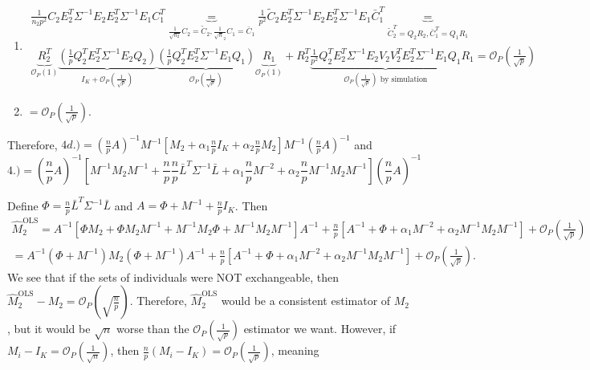 \documentclass{article}
\begin{document}
\begin{enumerate}
\begin{enumerate}
\begin{enumerate}
		\item \begin{multline}
		\frac{1}{n_2p^2}C_2E_2^T \Sigma^{-1}E_2E_2^T\Sigma^{-1}E_1C_1^T \underbrace{=}_{\frac{1}{\sqrt{n_2}}C_2 = \tilde{C}_2, \frac{1}{\sqrt{n}_2}C_1 = \bar{C}_1} \frac{1}{p^2}\tilde{C}_2 E_2^T \Sigma^{-1}E_2E_2^T\Sigma^{-1}E_1\bar{C}_1^T \underbrace{=}_{\tilde{C}_2^T = Q_2R_2, \bar{C}_1^T = Q_1R_1}\\
		\underbrace{R_2^T}_{\mathcal{O}_P(1)} \underbrace{\left(\frac{1}{p} Q_2^T E_2^T \Sigma^{-1}E_2Q_2 \right)}_{I_K + \mathcal{O}_P\left( \frac{1}{\sqrt{p}} \right)} \underbrace{\left(\frac{1}{p} Q_2^TE_2^T\Sigma^{-1}E_1 Q_1 \right)}_{\mathcal{O}_P\left( \frac{1}{\sqrt{p}} \right)} \underbrace{R_1}_{\mathcal{O}_P(1)} + R_2^T \underbrace{\frac{1}{p^2} Q_2^T E_2^T \Sigma^{-1}E_2V_2 V_2^TE_2^T\Sigma^{-1}E_1 Q_1}_{\mathcal{O}_P\left( \frac{1}{\sqrt{p}}\right) \text{ by simulation}} R_1 = \mathcal{O}_P\left( \frac{1}{\sqrt{p}}\right)
		\end{multline}				
		\item $ = \mathcal{O}_P\left( \frac{1}{\sqrt{p}}\right)$.
		\end{enumerate}
		Therefore, $4d.) = \left( \frac{n}{p}A \right)^{-1} M^{-1}\left[ M_2 + \alpha_1\frac{n}{p}I_K + \alpha_2\frac{n}{p} M_2 \right]M^{-1}\left( \frac{n}{p}A \right)^{-1}$ and
		\begin{equation}
		\text{4.)} = \left( \frac{n}{p}A \right)^{-1}\left[ M^{-1}M_2M^{-1} + \frac{n}{p}\frac{n}{p}\bar{L}^T\Sigma^{-1}\bar{L} + \alpha_1\frac{n}{p}M^{-2} + \alpha_2\frac{n}{p}M^{-1}M_2M^{-1} \right]\left( \frac{n}{p}A \right)^{-1}
		\end{equation}
	\end{enumerate}
\end{enumerate}
Define $\Phi = \frac{n}{p}\bar{L}^T \Sigma^{-1}\bar{L}$ and $A =  \Phi + M^{-1} + \frac{n}{p}I_K$. Then
\begin{multline}
\hat{M}_2^{\text{OLS}} = A^{-1}\left[ \Phi M_2 + \Phi M_2M^{-1} + M^{-1}M_2 \Phi + M^{-1}M_2 M^{-1}\right] A^{-1} + \frac{n}{p}\left[ A^{-1} + \Phi + \alpha_1 M^{-2} + \alpha_2 M^{-1}M_2 M^{-1} \right] + \mathcal{O}_P\left( \frac{1}{\sqrt{p}} \right)\\
= A^{-1}\left( \Phi + M^{-1} \right)M_2 \left( \Phi + M^{-1} \right)A^{-1} + \frac{n}{p}\left[ A^{-1} + \Phi + \alpha_1 M^{-2} + \alpha_2 M^{-1}M_2 M^{-1} \right] + \mathcal{O}_P\left( \frac{1}{\sqrt{p}} \right).
\end{multline}
We see that if the sets of individuals were NOT exchangeable, then $\hat{M}_2^{\text{OLS}} - M_2 = \mathcal{O}_P\left( \sqrt{\frac{n}{p}} \right)$. Therefore, $\hat{M}_2^{\text{OLS}}$ would be a consistent estimator of $M_2$, but it would be $\sqrt{n}$ worse than the $\mathcal{O}_P\left( \frac{1}{\sqrt{p}} \right)$ estimator we want. However, if $M_i - I_K = \mathcal{O}_P\left( \frac{1}{\sqrt{n}} \right)$, then $\frac{n}{p}\left( M_i - I_K \right) = \mathcal{O}_P\left( \frac{1}{\sqrt{p}} \right)$, meaning
\end{document}
